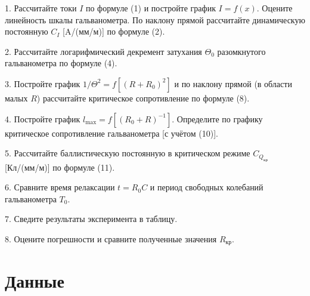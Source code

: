 1. Рассчитайте токи $I$ по формуле (1) и постройте график $I = f(x)$. Оцените линейность шкалы гальванометра. По наклону прямой рассчитайте динамическую постоянную $C_I$ [A/(мм/м)] по формуле (2).

2. Рассчитайте логарифмический декремент затухания $\Theta_0$ разомкнутого гальванометра по формуле (4).

3. Постройте график $1/{\Theta^2} = f[(R + R_0)^2]$ и по наклону прямой (в области малых $R$) рассчитайте критическое сопротивление по формуле (8).

4. Постройте график $l_{\text{max}} = f[(R_0 + R)^{-1}]$. Определите по графику критическое сопротивление гальванометра [с учётом (10)].

5. Рассчитайте баллистическую постоянную в критическом режиме $C_{Q_{\text{кр}}}$ [Кл/(мм/м)] по формуле (11).

6. Сравните время релаксации $t = R_0 C$ и период свободных колебаний гальванометра $T_0$.

7. Сведите результаты эксперимента в таблицу.

8. Оцените погрешности и сравните полученные значения $R_{\text{кр}}$.
\section{\label{sec:level1}Данные}


